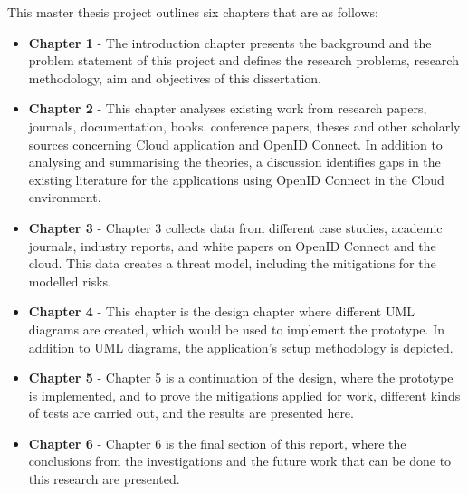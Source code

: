This master thesis project outlines six chapters that are as follows:

\begin{itemize}
    \item \textbf{Chapter 1} - The introduction chapter presents the background and the problem statement of this project and defines the research problems, research methodology, aim and objectives of this dissertation.

    \item \textbf{Chapter 2} - This chapter analyses existing work from research papers, journals, documentation, books, conference papers, theses and other scholarly sources concerning Cloud application and OpenID Connect. In addition to analysing and summarising the theories, a discussion identifies gaps in the existing literature for the applications using OpenID Connect in the Cloud environment.

    \item \textbf{Chapter 3} - Chapter 3 collects data from different case studies, academic journals, industry reports, and white papers on OpenID Connect and the cloud. This data creates a threat model, including the mitigations for the modelled risks. 
    
    \item \textbf{Chapter 4} - This chapter is the design chapter where different UML diagrams are created, which would be used to implement the prototype. In addition to UML diagrams, the application's setup methodology is depicted.
    
    \item \textbf{Chapter 5} - Chapter 5 is a continuation of the design, where the prototype is implemented, and to prove the mitigations applied for work, different kinds of tests are carried out, and the results are presented here.
    
    \item \textbf{Chapter 6} - Chapter 6 is the final section of this report, where the conclusions from the investigations and the future work that can be done to this research are presented.

\end{itemize}